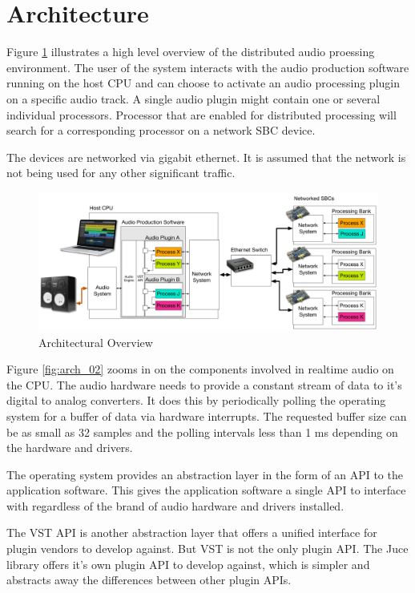\section{Architecture}

Figure \ref{fig:arch_01} illustrates a high level overview of the distributed audio proessing environment. The user of the system interacts with the audio production software running on the host CPU and can choose to activate an audio processing plugin on a specific audio track. A single audio plugin might contain one or several individual processors. Processor that are enabled for distributed processing will search for a corresponding processor on a network SBC device.

The devices are networked via gigabit ethernet. It is assumed that the network is not being used for any other significant traffic.

\begin{figure}[H]
    \centering
    \includegraphics[width=\textwidth]{assets/architecture_01.pdf}
    \caption{Architectural Overview}
    \label{fig:arch_01}
\end{figure}

Figure \ref{fig:arch_02} zooms in on the components involved in realtime audio on the CPU. The audio hardware needs to provide a constant stream of data to it's digital to analog converters. It does this by periodically polling the operating system for a buffer of data via hardware interrupts. The requested buffer size can be as small as 32 samples and the polling intervals less than 1 ms depending on the hardware and drivers.

The operating system provides an abstraction layer in the form of an API to the application software. This gives the application software a single API to interface with regardless of the brand of audio hardware and drivers installed.

The VST API is another abstraction layer that offers a unified interface for plugin vendors to develop against. But VST is not the only plugin API. The Juce library offers it's own plugin API to develop against, which is simpler and abstracts away the differences between other plugin APIs.

